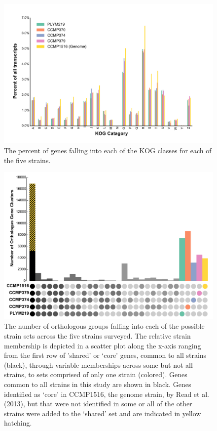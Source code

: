 \begin{figure}[p!]
  \centering
    \includegraphics[width=1.0\textwidth]{Images/C6_FigureS2_KOG_Distribution}
    \caption{The percent of genes falling into each of the KOG classes for each of the five strains.}
    \label{fig:a5f2}
\end{figure}


\begin{figure}[p!]
  \centering
    \includegraphics[width=1.0\textwidth]{Images/C6_FigureS3_GeneDistrubtion.pdf}
    \caption[The number of orthologous groups falling into each of the possible strain sets across the five strains surveyed]{The number of orthologous groups falling into each of the possible strain sets across the five strains surveyed. The relative strain membership is depicted in a scatter plot along the x-axis ranging from the first row of 'shared' or `core' genes, common to all strains (black), through variable memberships across some but not all strains, to sets comprised of only one strain (colored). Genes common to all strains in this study are shown in black. Genes identified as `core' in CCMP1516, the genome strain, by Read et al. (2013), but that were not identified in some or all of the other strains were added to the `shared' set and are indicated in yellow hatching. }
    \label{fig:a5f3}
\end{figure}


